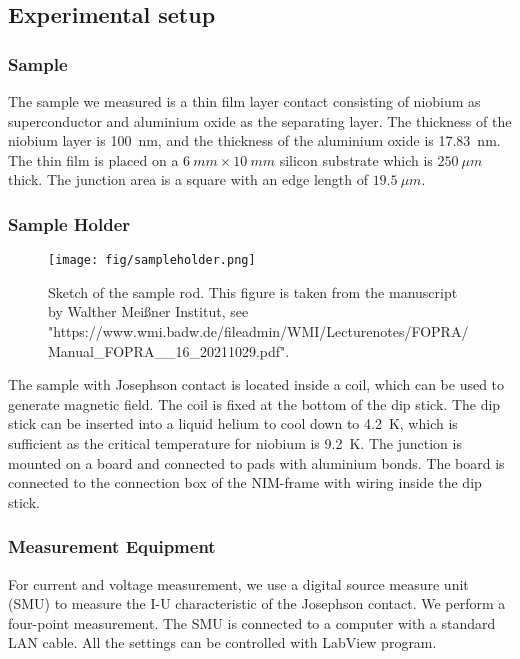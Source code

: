 \subsection{Experimental setup}

\subsubsection{Sample}
The sample we measured is a thin film layer contact consisting of niobium as superconductor and aluminium oxide as the separating layer. The thickness of the niobium layer is \SI{100}{nm}, and the thickness of the aluminium oxide is \SI{17.83}{nm}. The thin film is placed on a $\SI{6}{mm} \times \SI{10}{mm}$ silicon substrate which is $\SI{250}{\mu m}$ thick. The junction area is a square with an edge length of $\SI{19.5}{\mu m}$.

\subsubsection{Sample Holder}

\begin{figure}

\centering
\texttt{[image: fig/sampleholder.png]}

\caption{Sketch of the sample rod. This figure is taken from the manuscript by Walther Meißner Institut, see "https://www.wmi.badw.de/fileadmin/WMI/Lecturenotes/FOPRA/Manual_FOPRA__16_20211029.pdf".}

\label{sampleholder}
\end{figure}

The sample with Josephson contact is located inside a coil, which can be used to generate magnetic field. The coil is fixed at the bottom of the dip stick. The dip stick can be inserted into a liquid helium to cool down to \SI{4.2}{K}, which is sufficient as the critical temperature for niobium is \SI{9.2}{K}. The junction is mounted on a board and connected to pads with aluminium bonds. The board is connected to the connection box of the NIM-frame with wiring inside the dip stick.

\subsubsection{Measurement Equipment}
For current and voltage measurement, we use a digital source measure unit (SMU) to measure the I-U characteristic of the Josephson contact. We perform a four-point measurement. The SMU is connected to a computer with a standard LAN cable. All the settings can be controlled with LabView program.

